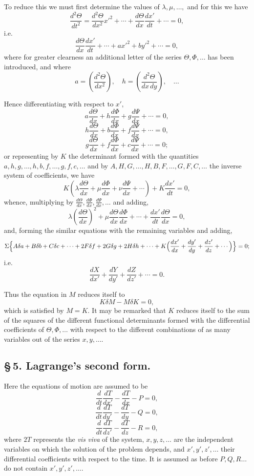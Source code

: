 \documentclass[12pt,a4paper]{article}
\begin{document}
To reduce this we must first determine the values of $\lambda, \mu,\ldots,$ and for this we have
\[
\frac{d^2\Theta}{dt^2} = \frac{d^2\Theta}{dx^2}{x'}^2 + \cdots + \frac{d\Theta}{dx}\frac{dx'}{dt} + \cdots = 0,
\]
i.e.
\[
\frac{d\Theta}{dx}\frac{dx'}{dt} + \cdots + a{x'}^2 + b{y'}^2 + \cdots = 0,
\]
where for greater clearness an additional letter of the series $\Theta, \Phi,\ldots$ has been introduced, and where
\[
a = \left(\frac{d^2\Theta}{dx^2}\right),\quad h = \left(\frac{d^2\Theta}{dx\,dy}\right),\quad \ldots
\]

Hence differentiating with respect to $x'$,
\[
a\frac{d\Theta}{dx} + h\frac{d\Phi}{dx} + g\frac{d\Psi}{dx} + \cdots = 0,
\]
\[
h\frac{d\Theta}{dx} + b\frac{d\Phi}{dx} + f\frac{d\Psi}{dx} + \cdots = 0,
\]
\[
g\frac{d\Theta}{dx} + f\frac{d\Phi}{dx} + c\frac{d\Psi}{dx} + \cdots = 0;
\]
or representing by $K$ the determinant formed with the quantities $a, h, g, \ldots, h, b, f, \ldots, g, f, c, \ldots$ and by $A, H, G, \ldots, H, B, F, \ldots, G, F, C, \ldots$ the inverse system of coefficients, we have
\[
K\left(\lambda\frac{d\Theta}{dx} + \mu\frac{d\Phi}{dx} + \nu\frac{d\Psi}{dx} + \cdots\right) + K\frac{dx'}{dt} = 0,
\]
whence, multiplying by $\frac{d\Theta}{dx}, \frac{d\Phi}{dx}, \frac{d\Psi}{dx}, \ldots$ and adding,
\[
\lambda\left(\frac{d\Theta}{dx}\right)^2 + \mu\frac{d\Theta}{dx}\frac{d\Phi}{dx} + \cdots + \frac{dx'}{dt}\frac{d\Theta}{dx} = 0,
\]
and, forming the similar equations with the remaining variables and adding,
\[
\Sigma\Bigl\{ A\delta a + B\delta b + C\delta c + \cdots + 2F\delta f + 2G\delta g + 2H\delta h + \cdots + K\Bigl(\frac{dx'}{dx} + \frac{dy'}{dy} + \frac{dz'}{dz}+\cdots\Bigr)\Bigr\} = 0;
\]
i.e.
\[
\frac{dX}{dx'} + \frac{dY}{dy'} + \frac{dZ}{dz'} + \cdots = 0.
\]

Thus the equation in $M$ reduces itself to
\[
K\delta M - M\delta K = 0,
\]
which is satisfied by $M = K$. It may be remarked that $K$ reduces itself to the sum of the squares of the different functional determinants formed with the differential coefficients of $\Theta, \Phi,\ldots$ with respect to the different combinations of as many variables out of the series $x, y, \ldots$.

\subsection*{\S\,5. Lagrange's second form.}

Here the equations of motion are assumed to be
\[
\frac{d}{dt}\frac{dT}{dx'} - \frac{dT}{dx} - P = 0,
\]
\[
\frac{d}{dt}\frac{dT}{dy'} - \frac{dT}{dy} - Q = 0,
\]
\[
\frac{d}{dt}\frac{dT}{dz'} - \frac{dT}{dz} - R = 0,
\]
where $2T$ represents the \emph{vis viva} of the system, $x, y, z,\ldots$ are the independent variables on which the solution of the problem depends, and $x', y', z',\ldots$ their differential coefficients with respect to the time. It is assumed as before $P, Q, R\ldots$ do not contain $x', y', z',\ldots$.
\end{document}
